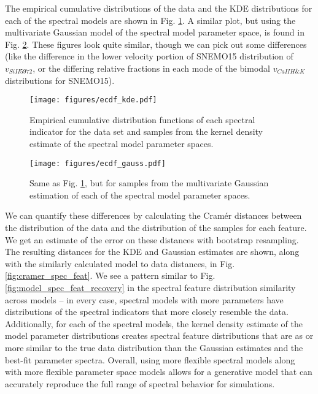The empirical cumulative distributions of the data and the KDE distributions for each of the spectral models are shown in Fig. \ref{fig:ecdf_kde}. A similar plot, but using the multivariate Gaussian model of the spectral model parameter space, is found in Fig. \ref{fig:ecdf_gauss}. These figures look quite similar, though we can pick out some differences (like the difference in the lower velocity portion of SNEMO15 distribution of $v_{SiII5972}$, or the differing relative fractions in each mode of the bimodal $v_{CaIIH\&K}$ distributions for SNEMO15).

\begin{figure}
    \centering
    \texttt{[image: figures/ecdf\_kde.pdf]}
    \caption{Empirical cumulative distribution functions of each spectral indicator for the data set and samples from the kernel density estimate of the spectral model parameter spaces.}
    \label{fig:ecdf_kde}
\end{figure}

\begin{figure}
    \centering
    \texttt{[image: figures/ecdf\_gauss.pdf]}
    \caption{Same as Fig. \ref{fig:ecdf_kde}, but for samples from the multivariate Gaussian estimation of each of the spectral model parameter spaces.}
    \label{fig:ecdf_gauss}
\end{figure}

We can quantify these differences by calculating the Cram\'{e}r distances between the distribution of the data and the distribution of the samples for each feature. We get an estimate of the error on these distances with bootstrap resampling. The resulting distances for the KDE and Gaussian estimates are shown, along with the similarly calculated model to data distances, in Fig. \ref{fig:cramer_spec_feat}. We see a pattern similar to Fig. \ref{fig:model_spec_feat_recovery} in the spectral feature distribution similarity across models -- in every case, spectral models with more parameters have distributions of the spectral indicators that more closely resemble the data. Additionally, for each of the spectral models, the kernel density estimate of the model parameter distributions creates spectral feature distributions that are as or more similar to the true data distribution than the Gaussian estimates and the best-fit parameter spectra. Overall, using more flexible spectral models along with more flexible parameter space models allows for a generative model that can accurately reproduce the full range of spectral behavior for simulations.

